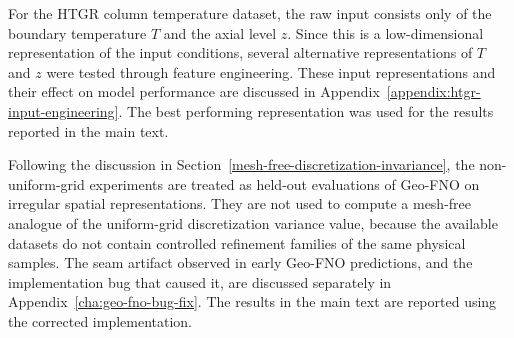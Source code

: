 For the HTGR column temperature dataset, the raw input consists only of
the boundary temperature $T$ and the axial level $z$. Since this is a
low-dimensional representation of the input conditions, several
alternative representations of $T$ and $z$ were tested through feature engineering. These input
representations and their effect on model performance are discussed in
Appendix~\ref{appendix:htgr-input-engineering}. The best performing representation was used for the results reported in the main text.

Following the discussion in Section~\ref{mesh-free-discretization-invariance}, the non-uniform-grid experiments are treated as held-out evaluations of Geo-FNO on irregular spatial representations. They are not used to compute a mesh-free analogue of the uniform-grid discretization variance value, because the available datasets do not contain controlled refinement families of the same physical samples. The seam artifact observed in early Geo-FNO predictions, and the implementation bug that caused it, are discussed separately in Appendix~\ref{cha:geo-fno-bug-fix}. The results in the main text are reported using the corrected implementation.